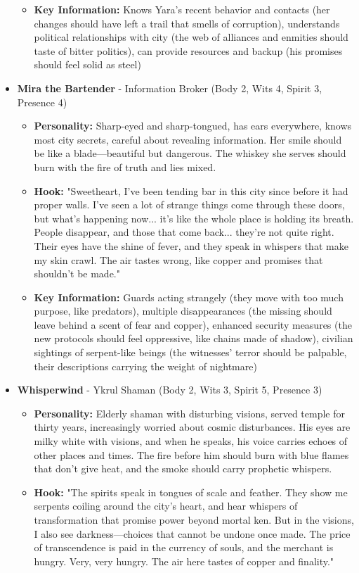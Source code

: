 \documentclass[11pt]{article}
\begin{document}
\begin{itemize}
\begin{itemize}
  \item \textbf{Key Information:} Knows Yara's recent behavior and contacts (her changes should have left a trail that smells of corruption), understands political relationships with city (the web of alliances and enmities should taste of bitter politics), can provide resources and backup (his promises should feel solid as steel)
  \end{itemize}
\item \textbf{Mira the Bartender} - Information Broker (Body 2, Wits 4, Spirit 3, Presence 4)
  \begin{itemize}
  \item \textbf{Personality:} Sharp-eyed and sharp-tongued, has ears everywhere, knows most city secrets, careful about revealing information. Her smile should be like a blade—beautiful but dangerous. The whiskey she serves should burn with the fire of truth and lies mixed.
  \item \textbf{Hook:} "Sweetheart, I've been tending bar in this city since before it had proper walls. I've seen a lot of strange things come through these doors, but what's happening now... it's like the whole place is holding its breath. People disappear, and those that come back... they're not quite right. Their eyes have the shine of fever, and they speak in whispers that make my skin crawl. The air tastes wrong, like copper and promises that shouldn't be made."
  \item \textbf{Key Information:} Guards acting strangely (they move with too much purpose, like predators), multiple disappearances (the missing should leave behind a scent of fear and copper), enhanced security measures (the new protocols should feel oppressive, like chains made of shadow), civilian sightings of serpent-like beings (the witnesses' terror should be palpable, their descriptions carrying the weight of nightmare)
  \end{itemize}
\item \textbf{Whisperwind} - Ykrul Shaman (Body 2, Wits 3, Spirit 5, Presence 3)
  \begin{itemize}
  \item \textbf{Personality:} Elderly shaman with disturbing visions, served temple for thirty years, increasingly worried about cosmic disturbances. His eyes are milky white with visions, and when he speaks, his voice carries echoes of other places and times. The fire before him should burn with blue flames that don't give heat, and the smoke should carry prophetic whispers.
  \item \textbf{Hook:} "The spirits speak in tongues of scale and feather. They show me serpents coiling around the city's heart, and hear whispers of transformation that promise power beyond mortal ken. But in the visions, I also see darkness—choices that cannot be undone once made. The price of transcendence is paid in the currency of souls, and the merchant is hungry. Very, very hungry. The air here tastes of copper and finality."

\end{itemize}
\end{itemize}
\end{document}
